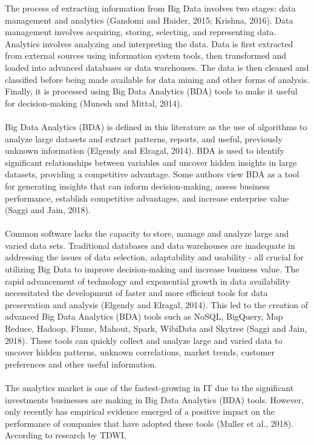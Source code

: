 The process of extracting information from Big Data involves two stages: data management and analytics
(Gandomi and Haider, 2015; Krishna, 2016). Data management involves acquiring, storing, selecting, and
representing data. Analytics involves analyzing and interpreting the data. Data is first extracted from
external sources using information system tools, then transformed and loaded into advanced databases or
data warehouses. The data is then cleaned and classified before being made available for data mining and
other forms of analysis. Finally, it is processed using Big Data Analytics (BDA) tools to make it useful
for decision-making (Munesh and Mittal, 2014).\\\\
Big Data Analytics (BDA) is defined in this literature as the use of algorithms to analyze large datasets and
extract patterns, reports, and useful, previously unknown information (Elgendy and Elragal, 2014).
BDA is used to identify significant relationships between variables and uncover hidden insights in large datasets,
providing a competitive advantage. Some authors view BDA as a tool for generating insights that can inform
decision-making, assess business performance, establish competitive advantages, and increase enterprise value
(Saggi and Jain, 2018).\\\\
Common software lacks the capacity to store, manage and analyze large and varied data sets. Traditional databases
and data warehouses are inadequate in addressing the issues of data selection, adaptability and usability - all
crucial for utilizing Big Data to improve decision-making and increase business value. The rapid advancement of
technology and exponential growth in data availability necessitated the development of faster and more efficient
tools for data preservation and analysis (Elgendy and Elragal, 2014). This led to the creation of advanced Big
Data Analytics (BDA) tools such as NoSQL, BigQuery, Map Reduce, Hadoop, Flume, Mahout, Spark, WibiData and
Skytree (Saggi and Jain, 2018). These tools can quickly collect and analyze large and varied data to uncover
hidden patterns, unknown correlations, market trends, customer preferences and other useful information.\\\\
The analytics market is one of the fastest-growing in IT due to the significant investments businesses are making
in Big Data Analytics (BDA) tools. However, only recently has empirical evidence emerged of a positive impact on
the performance of companies that have adopted these tools (Muller et al., 2018). According to research by TDWI,
